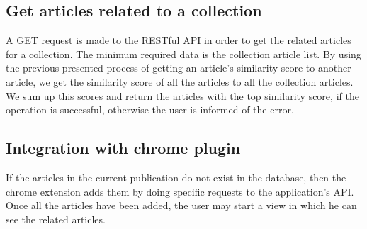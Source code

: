 \subsection{Get articles related to a collection}
\label{sec:workflow-get-articles-related-to-collection}
A GET request is made to the RESTful API in order to get the related articles for  a collection.
The minimum required data is the collection article list.
By using the previous presented process of getting an article’s similarity score to another article, we get the similarity score of all the articles to all the collection articles. We sum up this scores and return the articles with the top similarity score, if the operation is successful, otherwise the user is informed of the error.

\subsection{Integration with chrome plugin}
\label{sec:workflow-integration-with-chrome-plugin}
If the articles in the current publication do not exist in the database, then the chrome extension adds them by doing specific requests to the application's API.
Once all the articles have been added, the user may start a view in which he can see the related articles.